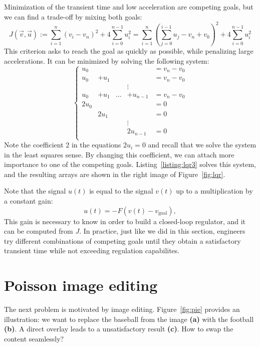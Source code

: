 \documentclass[notitlepage,oneside]{book}
\begin{document}
Minimization of the transient time and low acceleration are competing goals, but we can find a trade-off by mixing both goals:
$$
J(\vec{v},\vec{u}) := \sum\limits_{i=1}^n (v_i-v_n)^2 + 4\sum\limits_{i=0}^{n-1} u_i^2 = \sum\limits_{i=1}^n \left(\sum\limits_{j=0}^{i-1}u_j-v_n+v_0\right)^2 + 4\sum\limits_{i=0}^{n-1} u_i^2
$$
This criterion asks to reach the goal as quickly as possible, while penalizing large accelerations. It can be minimized by solving the following system:
$$
\left \{ \begin{array}{ccccl}
u_0 &       &       &           & = v_n - v_0 \\
u_0 & + u_1 &       &           & = v_n - v_0 \\
    &       &       & \vdots    &             \\
u_0 & + u_1 & \dots & + u_{n-1} & = v_n - v_0 \\
2u_0 &        &       &           & = 0 \\
     &  2u_1  &       &           & = 0 \\
     &        &       & \vdots    &     \\
     &        &       &  2u_{n-1} & = 0 \\
\end{array} \right.
$$
Note the coefficient 2 in the equations $2 u_i = 0$ and recall that we solve the system in the least squares sense.
By changing this coefficient, we can attach more importance to one of the competing goals.
Listing~\ref{listing:lqr3} solves this system, and the resulting arrays are shown in the right image of Figure~\ref{fig:lqr}.


Note that the signal $u(t)$ is equal to the signal $v(t)$ up to a multiplication by a constant gain:
$$
u(t) = -F (v(t) - v_{\text{goal}}),
$$
This gain is necessary to know in order to build a closed-loop regulator, and it can be computed from $J$.
In practice, just like we did in this section,
engineers try different combinations of competing goals until they obtain a satisfactory transient time while not exceeding regulation capabilites.






\section{Poisson image editing}
\label{sec:poisson}
The next problem is motivated by image editing.
Figure~\ref{fig:pie} provides an illustration:
we want to replace the baseball from the image \textbf{(a)} with the football \textbf{(b)}. A direct overlay leads to a unsatisfactory result \textbf{(c)}.
How to swap the content seamlessly?
\end{document}
